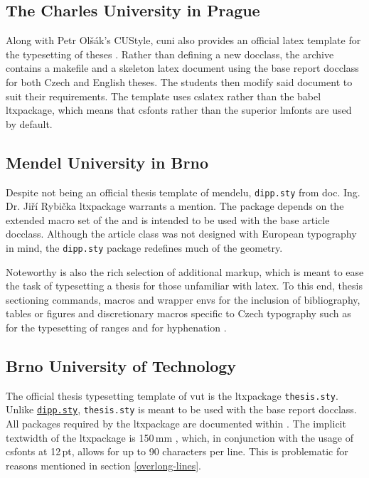     \subsection{The Charles University in Prague}
    Along with Petr Olšák's CUStyle, \gls{cuni} also provides an official \gls{latex} template for the typesetting of theses \cite{cunisablona}. Rather than defining a new \gls{docclass}, the archive contains a \gls{makefile} and a skeleton \gls{latex} document using the base report \gls{docclass} for both Czech and English theses. The students then modify said document to suit their requirements. The template uses \gls{cslatex} rather than the babel \gls{ltxpackage}, which means that \gls{csfonts} rather than the superior \gls{lmfonts} \cite{cslatexvsbabel} are used by default.

    \subsection{Mendel University in Brno}\label{sec:dipp.sty}
    Despite not being an official thesis template of \gls{mendelu}, \texttt{dipp.sty} from doc. Ing. Dr. Jiří Rybička \gls{ltxpackage} warrants a mention. The package depends on the extended macro set of the   and is intended to be used with the base article \gls{docclass}. Although the article class was not designed with European typography in mind, the \texttt{dipp.sty} package redefines much of the geometry.

    Noteworthy is also the rich selection of additional markup, which is meant to ease the task of typesetting a thesis for those unfamiliar with \gls{latex}. To this end, thesis sectioning commands, macros and wrapper \glspl{env} for the inclusion of bibliography, tables or figures and discretionary macros specific to Czech typography such as  for the typesetting of ranges and  for hyphenation \cite{dippman}.

    \subsection{Brno University of Technology}
    The official thesis typesetting template of \gls{vut} is the \gls{ltxpackage} \texttt{thesis.sty}. Unlike \texttt{\hyperref[sec:dipp.sty]{\tt dipp.sty}}, \texttt{thesis.sty} is meant to be used with the base report \gls{docclass}. All packages required by the \gls{ltxpackage} are documented within \cite[p.~9]{thesis.sty-doc}\pending{}. The implicit \gls{textwidth} of the \gls{ltxpackage} is 150\,mm \cite[p.~2]{thesis.sty-doc}, which, in conjunction with the usage of \gls{csfonts} at 12\,pt, allows for up to 90 characters per line. This is problematic for reasons mentioned in section \ref{overlong-lines}.
    
